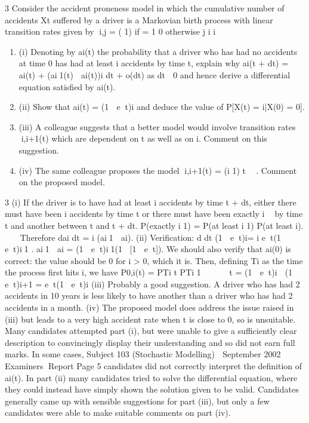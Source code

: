 \documentclass[a4paper,12pt]{article}
\begin{document}
3 Consider the accident proneness model in which the cumulative number of accidents
Xt suffered by a driver is a Markovian birth process with linear transition rates given
by
i,j =
( 1) if = 1
0 otherwise
j i i    
\begin{enumerate}
\item (i) Denoting by ai(t) the probability that a driver who has had no accidents at
time 0 has had at least i accidents by time t, explain why
ai(t + dt) = ai(t) + (ai1(t)  ai(t))i
dt + o(dt)
as dt  0 and hence derive a differential equation satisfied by ai(t). 
\item (ii) Show that
ai(t) = (1  et)i
and deduce the value of P[X(t) = i|X(0) = 0]. 


\item (iii) A colleague suggests that a better model would involve transition rates i,i+1(t)
which are dependent on t as well as on i. Comment on this suggestion. 
\item (iv) The same colleague proposes the model i,i+1(t) = (i 1)
t
 . Comment on the
proposed model. 
\end{enumerate}


3 (i) If the driver is to have had at least i accidents by time t + dt, either there must
have been i accidents by time t or there must have been exactly i 	 by time t
and another between t and t + dt.
P(exactly i 1) = P(at least i 1) P(at least i).   
Therefore
dai
dt
= i
(ai1  ai).
(ii) Verification: d
dt
{(1  et)i}= i
et(1  et)i1 .
ai1  ai = (1  et)i1(1 [1  et]).
We should also verify that ai(0) is correct: the value should be 0 for i > 0,
which it is.
Then, defining Ti as the time the process first hits i, we have
P0,i(t) = P{Ti t} P{Ti 1 
    t} = (1  et)i  (1  et)i+1 = et(1 et)i
(iii)  Probably a good suggestion. A driver who has had 2 accidents in 10 years is
less likely to have another than a driver who has had 2 accidents in a month.
(iv) The proposed model does address the issue raised in (iii) but leads to a very
high accident rate when t is close to 0, so is unsuitable.
\newpage
Many candidates attempted part (i), but were unable to give a sufficiently clear description to
convincingly display their understanding and so did not earn full marks. In some cases,
Subject 103 (Stochastic Modelling)  September 2002  Examiners Report
Page 5
candidates did not correctly interpret the definition of ai(t). In part (ii) many candidates tried
to solve the differential equation, where they could instead have simply shown the solution
given to be valid. Candidates generally came up with sensible suggestions for part (iii), but
only a few candidates were able to make suitable comments on part (iv).
\end{document}
